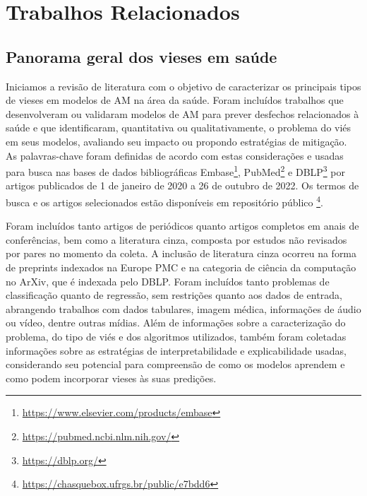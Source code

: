 \chapter{Trabalhos Relacionados}


\section{Panorama geral dos vieses em saúde}\label{sec:panorama}

Iniciamos a revisão de literatura com o objetivo de caracterizar os principais tipos de vieses em modelos de AM na área da saúde. Foram incluídos trabalhos que desenvolveram ou validaram modelos de AM para prever desfechos relacionados à saúde e que identificaram, quantitativa ou qualitativamente, o problema do viés em seus modelos, avaliando seu impacto ou propondo estratégias de mitigação. As palavras-chave foram definidas de acordo com estas considerações e usadas para busca
nas bases de dados bibliográficas Embase\footnote{\url{https://www.elsevier.com/products/embase}}, PubMed\footnote{\url{https://pubmed.ncbi.nlm.nih.gov/}} e DBLP\footnote{\url{https://dblp.org/}} por artigos publicados de 1 de janeiro de 2020 a 26 de outubro de 2022. Os termos de busca e os artigos selecionados estão disponíveis em repositório público \footnote{ \url{https://chasquebox.ufrgs.br/public/e7bdd6}}.

Foram incluídos tanto artigos de periódicos quanto artigos completos em anais de conferências, bem como a literatura cinza, composta por estudos não revisados por pares no momento da coleta. A inclusão de literatura cinza ocorreu na forma de preprints indexados na Europe PMC e na categoria de ciência da computação no ArXiv,  que é indexada pelo DBLP. Foram incluídos tanto problemas de classificação quanto de regressão, sem restrições quanto aos dados de entrada, abrangendo trabalhos com dados tabulares, imagem médica, informações de áudio ou vídeo, dentre outras mídias. Além de informações sobre a caracterização do problema, do tipo de viés e dos algoritmos utilizados, também foram coletadas informações sobre as estratégias de interpretabilidade e explicabilidade usadas, considerando seu potencial para compreensão de como os modelos aprendem e como podem incorporar vieses às suas predições.

